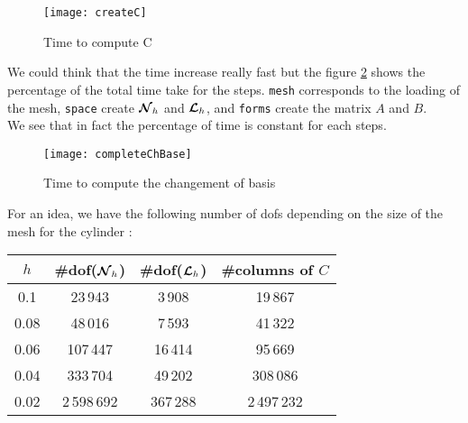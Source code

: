 \begin{figure}[H]
\centering
\texttt{[image: createC]}
\caption{Time to compute C}
\label{timeC}
\end{figure}

We could think that the time increase really fast but the figure \ref{completeTime} shows the percentage of the total time take for the steps. \texttt{mesh} corresponds to the loading of the mesh, \texttt{space} create ${\bm{\mathcal{N}}}_h$ and ${\bm{\mathcal{L}}}_h$, and \texttt{forms} create the matrix $A$ and $B$.\\
We see that in fact the percentage of time is constant for each steps.

\begin{figure}[H]
\centering
\texttt{[image: completeChBase]}
\caption{Time to compute the changement of basis}
\label{completeTime}
\end{figure}

For an idea, we have the following number of dofs depending on the size of the mesh for the cylinder :
\begin{center}
\begin{tabular}{ c | c | c | c }
$h$ & \#dof(${\bm{\mathcal{N}}}_h$) & \#dof(${\bm{\mathcal{L}}}_h$) & \#columns of $C$ \\ \hline
0.1 & 23\,943 & 3\,908 & 19\,867 \\ \hline
0.08 & 48\,016 & 7\,593 & 41\,322 \\ \hline
0.06 & 107\,447 & 16\,414 & 95\,669 \\ \hline
0.04 & 333\,704 & 49\,202 & 308\,086 \\ \hline
0.02 & 2\,598\,692 & 367\,288 & 2\,497\,232 \\ \hline
\end{tabular}
\end{center}



